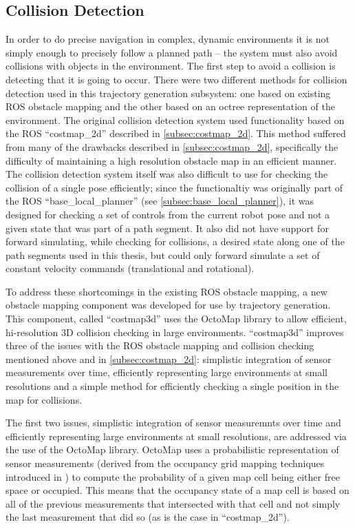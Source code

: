 \subsection{Collision Detection}\label{subsec:trajectory_generation_costmap3d}


In order to do precise navigation in complex, dynamic environments it is not simply enough to precisely follow a planned path -- the system must also avoid collisions with objects in the environment. The first step to avoid a collision is detecting that it is going to occur. There were two different methods for collision detection used in this trajectory generation subsystem: one based on existing ROS obstacle mapping and the other based on an octree representation of the environment. The original collision detection system used functionality based on the ROS ``costmap\_2d'' described in \autoref{subsec:costmap_2d}. This method suffered from many of the drawbacks described in \autoref{subsec:costmap_2d}, specifically the difficulty of maintaining a high resolution obstacle map in an efficient manner. The collision detection system itself was also difficult to use for checking the collision of a single pose efficiently; since the functionaltiy was originally part of the ROS ``base\_local\_planner'' (see \autoref{subsec:base_local_planner}), it was designed for checking a set of controls from the current robot pose and not a given state that was part of a path segment. It also did not have support for forward simulating, while checking for collisions, a desired state along one of the path segments used in this thesis, but could only forward simulate a set of constant velocity commands (translational and rotational).

To address these shortcomings in the existing ROS obstacle mapping, a new obstacle mapping component was developed for use by trajectory generation. This component, called ``costmap3d'' uses the OctoMap library  to allow efficient, hi-resolution 3D collision checking in large environments. ``costmap3d'' improves three of the issues with the ROS obstacle mapping and collision checking mentioned above and in \autoref{subsec:costmap_2d}: simplistic integration of sensor measurements over time, efficiently representing large environments at small resolutions and a simple method for efficiently checking a single position in the map for collisions.

The first two issues, simplistic integration of sensor measuremnts over time and efficiently representing large environments at small resolutions, are addressed via the use of the OctoMap library. OctoMap uses a probabilistic representation of sensor measurements (derived from the occupancy grid mapping techniques introduced in \autocite{Moravec_1985_1840}) to compute the probability of a given map cell being either free space or occupied. This means that the occupancy state of a map cell is based on all of the previous measurements that intersected with that cell and not simply the last measurement that did so (as is the case in ``costmap\_2d'').

